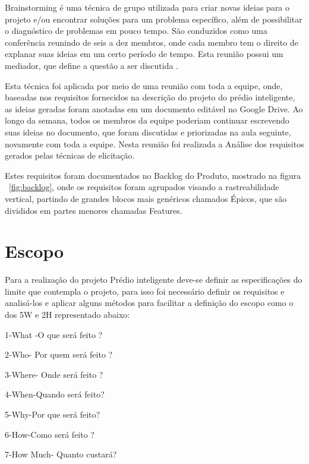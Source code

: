 Brainstorming é uma técnica de grupo utilizada para criar novas ideias para o projeto e/ou encontrar soluções para um problema específico, além de possibilitar o diagnóstico de problemas em pouco tempo. São conduzidos como uma conferência reunindo de seis a dez membros, onde cada membro tem o direito de explanar suas ideias em um certo período de tempo. Esta reunião possui um mediador, que define a questão a ser discutida \cite{gunda2008}.

Esta técnica foi aplicada por meio de uma reunião com toda a equipe, onde, baseadas nos requisitos fornecidos na descrição do projeto do prédio inteligente, as ideias geradas foram anotadas em um documento editável no Google Drive. Ao longo da semana, todos os membros da equipe poderiam continuar escrevendo suas ideias no documento, que foram discutidas e priorizadas na aula seguinte, novamente com toda a equipe. Nesta reunião foi realizada a Análise dos requisitos gerados pelas técnicas de elicitação.

Estes requisitos foram documentados no Backlog do Produto, mostrado na figura ~\ref{fig:backlog}, onde os requisitos foram agrupados visando a rastreabilidade vertical, partindo de grandes blocos mais genéricos chamados Épicos, que são divididos em partes menores chamadas Features.


\chapter{Escopo}
Para a realização do projeto Prédio inteligente deve-se definir as especificações do limite que contempla o projeto, para isso foi necessário definir os requisitos e analisá-los e aplicar alguns métodos para facilitar a definição do escopo como o dos 5W e 2H representado abaixo:

1-What -O que será feito ?

2-Who- Por quem será feito ?

3-Where- Onde será feito ?

4-When-Quando será feito?

5-Why-Por que será feito?

6-How-Como será feito ?

7-How Much- Quanto custará?

